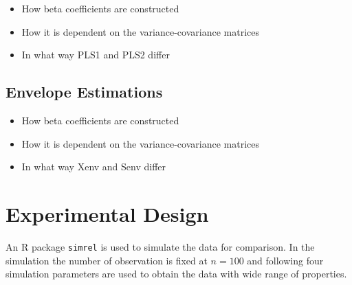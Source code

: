 \documentclass[12pt,3p,authoryear]{elsarticle}
\providecommand{\tightlist}{%
  \setlength{\itemsep}{0pt}\setlength{\parskip}{0pt}}
\begin{document}
\begin{itemize}
\tightlist
\item
  How beta coefficients are constructed
\item
  How it is dependent on the variance-covariance matrices
\item
  In what way PLS1 and PLS2 differ
\end{itemize}

\subsection{Envelope Estimations}\label{envelope-estimations}

\begin{itemize}
\tightlist
\item
  How beta coefficients are constructed
\item
  How it is dependent on the variance-covariance matrices
\item
  In what way Xenv and Senv differ
\end{itemize}

\hypertarget{experimental-design}{\section{Experimental
Design}\label{experimental-design}}

An R \citep{coreR2018} package \texttt{simrel}
\citep{Rimal2018, saebo2015simrel} is used to simulate the data for
comparison. In the simulation the number of observation is fixed at
\(n = 100\) and following four simulation parameters are used to obtain
the data with wide range of properties.
\end{document}
